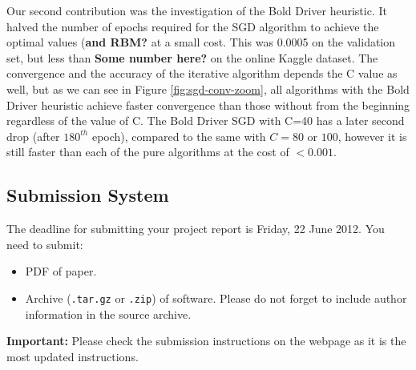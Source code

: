 \documentclass[10pt,conference,compsocconf]{IEEEtran}
\begin{document}
Our second contribution was the investigation of the Bold Driver heuristic. It halved the number of epochs required for the SGD algorithm to achieve the optimal values (\textbf{and RBM?} at a small cost. This was 0.0005 on the validation set, but less than \textbf{Some number here?} on the online Kaggle dataset. The convergence and the accuracy of the iterative algorithm depends the C value as well, but as we can see in Figure \ref{fig:sgd-conv-zoom}, all algorithms with the Bold Driver heuristic achieve faster convergence than those without from the beginning regardless of the value of C. The Bold Driver SGD with C=40 has a later second drop (after $180^{th}$ epoch), compared to the same with $C=80$ or $100$, however it is still faster than each of the pure algorithms at the cost of $<0.001$.




%
%


\subsection{Submission System}

The deadline for submitting your project report is Friday, 22 June
2012.
You need to submit:
\begin{itemize}
\item PDF of paper.
\item Archive (\texttt{.tar.gz} or \texttt{.zip}) of software. Please
  do not forget to include author information in the source archive.
\end{itemize}

\textbf{Important:} Please check the submission instructions on the webpage 
as it is the most updated instructions. 
\end{document}
